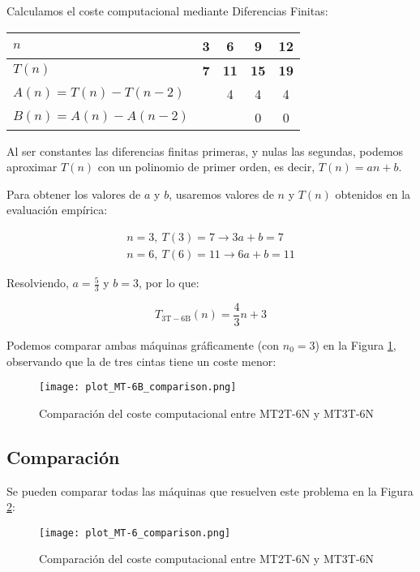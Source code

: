 Calculamos el coste computacional mediante Diferencias Finitas:

\begin{table}[H]
    \centering
    \begin{tabular}{|l|c|c|c|c|}
        \hline
        $n$    & \textbf{3} & \textbf{6}  & \textbf{9}  & \textbf{12} \\ \hline
        $T(n)$ & \textbf{7} & \textbf{11} & \textbf{15} & \textbf{19} \\ \hline
        \hline
        $A(n) = T(n) - T(n-2)$ &   & 4 & 4 & 4 \\ \hline
        $B(n) = A(n) - A(n-2)$ &   &   & 0 & 0 \\ \hline
    \end{tabular}
\end{table}

Al ser constantes las diferencias finitas primeras, y nulas las segundas, podemos aproximar $T(n)$ con un polinomio de primer orden, es decir, $T(n) = an + b$.\medskip

Para obtener los valores de $a$ y $b$, usaremos valores de $n$ y $T(n)$ obtenidos en la evaluación empírica:

\begin{subequations}
    \begin{gather}
        n = 3,\ T(3) = 7 \rightarrow 3a + b = 7 \\
        n = 6,\ T(6) = 11 \rightarrow 6a + b = 11
    \end{gather}
\end{subequations}

Resolviendo, $a=\frac{5}{3}$ y $b=3$, por lo que:

\begin{equation}
    T_{\mathrm{3T-6B}}(n) = \frac{4}{3}n + 3
\end{equation}


Podemos comparar ambas máquinas gráficamente (con $n_0 = 3$) en la Figura \ref{fig:MT-6B}, observando que la de tres cintas tiene un coste menor:

\begin{figure}[H]
    \centering
    \texttt{[image: plot\_MT-6B\_comparison.png]}
    \caption{Comparación del coste computacional entre MT2T-6N y MT3T-6N}
    \label{fig:MT-6B}
\end{figure}


\subsection*{Comparación}
Se pueden comparar todas las máquinas que resuelven este problema en la Figura \ref{fig:MT-6}:
\begin{figure}[H]
    \centering
    \texttt{[image: plot\_MT-6\_comparison.png]}
    \caption{Comparación del coste computacional entre MT2T-6N y MT3T-6N}
    \label{fig:MT-6}
\end{figure}